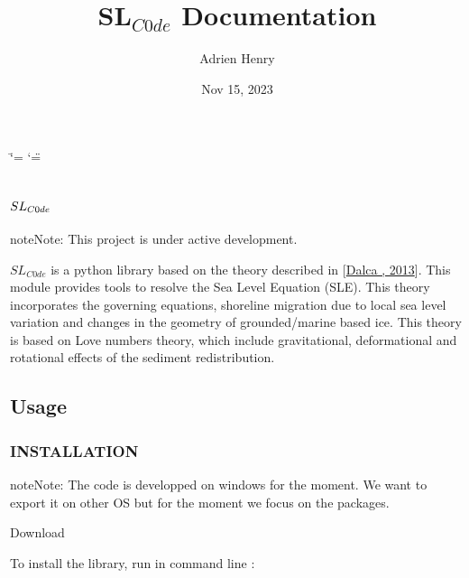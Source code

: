\documentclass[letterpaper,10pt,english]{sphinxmanual}
\title{SL$_{C0de}$ Documentation}
\date{Nov 15, 2023}
\author{Adrien Henry}
\begin{document}
\ifdefined\shorthandoff
  \ifnum\catcode`\=\string=\active\shorthandoff{=}\fi
  \ifnum\catcode`\"=\active{}\fi
\fi

\pagestyle{empty}
\sphinxmaketitle
\pagestyle{plain}
\sphinxtableofcontents
\pagestyle{normal}
\label{\detokenize{index::doc}}



\chapter{\protect\(SL_{C0de}\protect\)}
\label{\detokenize{index:sl-c0de}}
\noindent{}

\begin{sphinxadmonition}{note}{Note:}
\sphinxAtStartPar
This project is under active development.
\end{sphinxadmonition}

\sphinxAtStartPar
\(SL_{C0de}\) is a python library based on the theory described in {[}\hyperlink{cite.index:id3}{Dalca , 2013}{]}. This module provides tools to resolve the Sea Level Equation (SLE). This theory incorporates the governing equations, shoreline migration due to local sea level variation and changes in the geometry of grounded/marine based ice. This theory is based on Love numbers theory, which include gravitational, deformational and rotational effects of the sediment redistribution.

\sphinxstepscope


\section{Usage}
\label{\detokenize{usage:usage}}\label{\detokenize{usage::doc}}

\subsection{INSTALLATION}
\label{\detokenize{usage:installation}}
\begin{sphinxadmonition}{note}{Note:}
\sphinxAtStartPar
The code is developped on windows for the moment. We want to export it on other OS but for the moment we focus on the packages.
\end{sphinxadmonition}

\sphinxAtStartPar
Download

\sphinxAtStartPar
To install the library, run in command line :
\end{document}
